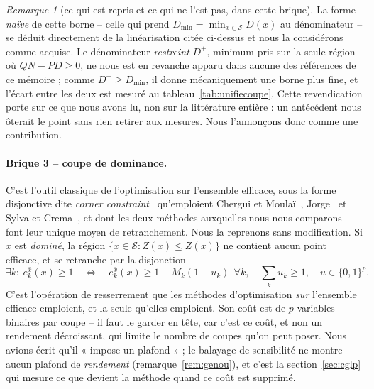 \documentclass[11pt,a4paper]{article}
\theoremstyle{plain}
\theoremstyle{remark}
\newtheorem{remark}{Remarque}
\newcommand{\Scal}{\mathcal{S}}
\begin{document}
\begin{remark}[ce qui est repris et ce qui ne l'est pas, dans cette brique]
\label{rem:attrib2}
La forme \emph{naïve} de cette borne -- celle qui prend
$D_{\min}=\min_{x\in\Scal}D(x)$ au dénominateur -- se déduit directement de
la linéarisation citée ci-dessus et nous la considérons comme acquise. Le
dénominateur \emph{restreint} $D^{+}$, minimum pris sur la seule région où
$QN-PD\ge 0$, ne nous est en revanche apparu dans aucune des références de
ce mémoire ; comme $D^{+}\ge D_{\min}$, il donne mécaniquement une borne
plus fine, et l'écart entre les deux est mesuré au
tableau~\ref{tab:unifiecoupe}. Cette revendication porte sur ce que nous
avons lu, non sur la littérature entière : un antécédent nous ôterait le
point sans rien retirer aux mesures. Nous l'annonçons donc comme une
contribution.
\end{remark}

\paragraph{Brique 3 -- coupe de dominance.} C'est l'outil classique de
l'optimisation sur l'ensemble efficace, sous la forme disjonctive dite
\emph{corner constraint}~\cite{klein1982} qu'emploient Chergui et
Moulaï~\cite{chergui2008}, Jorge~\cite{jorge2009} et Sylva et
Crema~\cite{sylva2004,sylva2007}, et dont les deux méthodes auxquelles nous
nous comparons~\cite{zerdani2011,drici2018} font leur unique moyen de
retranchement. Nous la reprenons sans modification. Si $\bar x$ est
\emph{dominé}, la région $\{x\in\Scal : Z(x)\le Z(\bar x)\}$ ne contient
aucun point efficace, et se retranche par la disjonction
\begin{equation}\label{eq:disj}
  \exists k:\ e^{\bar x}_k(x)\ge 1
  \quad\Longleftrightarrow\quad
  e^{\bar x}_k(x)\ge 1-M_k(1-u_k)\ \ \forall k,\quad
  \textstyle\sum_k u_k\ge 1,\quad u\in\{0,1\}^p .
\end{equation}
C'est l'opération de resserrement que les méthodes d'optimisation \emph{sur}
l'ensemble efficace emploient, et la seule qu'elles emploient. Son
coût est de $p$ variables binaires par coupe -- il faut le garder en tête,
car c'est ce coût, et non un rendement décroissant, qui limite le nombre de
coupes qu'on peut poser. Nous avions écrit qu'il « impose un plafond » ;
le balayage de sensibilité ne montre aucun plafond de \emph{rendement}
(remarque~\ref{rem:genou}), et c'est la section~\ref{sec:cglp} qui mesure
ce que devient la méthode quand ce coût est supprimé.
\end{document}
